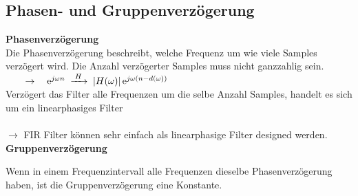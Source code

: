 	\subsection{Phasen- und Gruppenverzögerung}
		\textbf{Phasenverzögerung}\\[0.1cm]
		Die Phasenverzögerung beschreibt, welche Frequenz um wie viele Samples verzögert wird. Die Anzahl verzögerter Samples muss nicht ganzzahlig sein.\\[0.2cm]
		$\qquad\rightarrow\quad \mathrm{e}^{j\omega n} \;\xrightarrow{\;H\;} \;|H(\omega)|\,\mathrm{e}^{j\omega (n-d(\omega))}$\\[0.3cm]
		Verzögert das Filter alle Frequenzen um die selbe Anzahl Samples, handelt es sich um ein linearphasiges Filter\\[0.2cm]
		\\[0.2cm]
		$\rightarrow$ FIR Filter können sehr einfach als linearphasige Filter designed werden.\\[0.2cm]
		\textbf{Gruppenverzögerung}\\[0.2cm]
		\begin{minipage}{0.25\textwidth}
		\end{minipage}
		\begin{minipage}{0.75\textwidth}
			Wenn in einem Frequenzintervall alle Frequenzen dieselbe Phasenverzögerung haben, ist die Gruppenverzögerung eine Konstante.
		\end{minipage}

